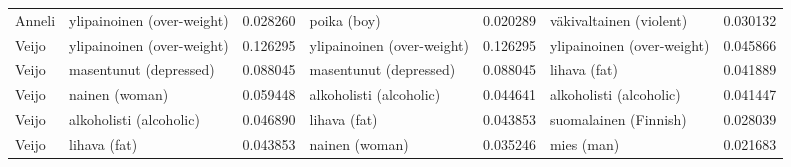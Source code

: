 \begin{longtable}{llrlrlr}
Anneli & ylipainoinen (over-weight) &                         0.028260 &                poika (boy) &                              0.020289 &    väkivaltainen (violent) &                        0.030132 \\
 Veijo & ylipainoinen (over-weight) &                         0.126295 & ylipainoinen (over-weight) &                              0.126295 & ylipainoinen (over-weight) &                        0.045866 \\
 Veijo &     masentunut (depressed) &                         0.088045 &     masentunut (depressed) &                              0.088045 &               lihava (fat) &                        0.041889 \\
 Veijo &             nainen (woman) &                         0.059448 &    alkoholisti (alcoholic) &                              0.044641 &    alkoholisti (alcoholic) &                        0.041447 \\
 Veijo &    alkoholisti (alcoholic) &                         0.046890 &               lihava (fat) &                              0.043853 &      suomalainen (Finnish) &                        0.028039 \\
 Veijo &               lihava (fat) &                         0.043853 &             nainen (woman) &                              0.035246 &                 mies (man) &                        0.021683 \\
\end{longtable}
